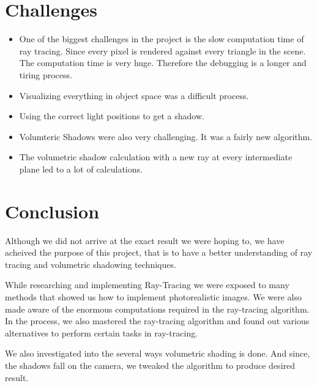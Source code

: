 \documentclass[paper=a4, fontsize=11pt]{scrartcl}
\numberwithin{equation}{section}		%
\numberwithin{figure}{section}			%
\numberwithin{table}{section}				%
\begin{document}
\section{Challenges}
\begin{itemize}
\item One of the biggest challenges in the project is the slow computation time of ray tracing. Since every pixel is rendered against every triangle in the scene. The computation time is very huge. Therefore the debugging is a longer and tiring process.
\item Visualizing everything in object space was a difficult process.
\item Using the correct light positions to get a shadow.
\item Volumteric Shadows were also very challenging. It was a fairly new algorithm.
\item The volumetric shadow calculation with a new ray at every intermediate plane led to a lot of calculations.
\end{itemize}
\section{Conclusion}
\par Although we did not arrive at the exact result we were hoping to, we have acheived the purpose of this project, that is to have a better understanding of ray tracing and volumetric shadowing techniques.
\par While researching and implementing Ray-Tracing we were exposed to many methods that showed us how to implement photorealistic images. We were also made aware of the enormous computations required in the ray-tracing algorithm. In the process, we also mastered the ray-tracing algorithm and found out various alternatives to perform certain tasks in ray-tracing.
\par We also investigated into the several ways volumetric shading is done. And since, the shadows fall on the camera, we tweaked the algorithm to produce desired result.

\nocite{*}
\printbibliography
\end{document}
